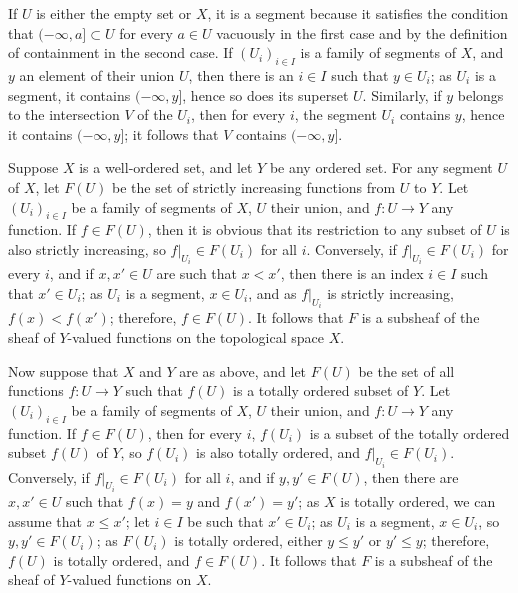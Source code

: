 \documentclass{article}
\begin{document}
\begin{solution}[\ref{exe:rpm18mof}]
  \label{sol:aeu4zzog}
  If \(U\) is either the empty set or \(X\), it is a segment because
  it satisfies the condition that \((-\infty, a] \subset U\) for every
  \(a \in U\) vacuously in the first case and by the definition of
  containment in the second case.  If \((U_i)_{i \in I}\) is a family
  of segments of \(X\), and \(y\) an element of their union \(U\),
  then there is an \(i \in I\) such that \(y \in U_i\); as \(U_i\) is
  a segment, it contains \((-\infty, y]\), hence so does its superset
  \(U\).  Similarly, if \(y\) belongs to the intersection \(V\) of the
  \(U_i\), then for every \(i\), the segment \(U_i\) contains \(y\),
  hence it contains \((-\infty, y]\); it follows that \(V\) contains
  \((-\infty, y]\).

  Suppose \(X\) is a well-ordered set, and let \(Y\) be any ordered
  set.  For any segment \(U\) of \(X\), let \(F(U)\) be the set of
  strictly increasing functions from \(U\) to \(Y\).  Let
  \((U_i)_{i \in I}\) be a family of segments of \(X\), \(U\) their
  union, and \(f : U \to Y\) any function.  If \(f \in F(U)\), then it
  is obvious that its restriction to any subset of \(U\) is also
  strictly increasing, so \(f \vert_{U_i} \in F(U_i)\) for all \(i\).
  Conversely, if \(f \vert_{U_i} \in F(U_i)\) for every \(i\), and if
  \(x, x' \in U\) are such that \(x < x'\), then there is an index
  \(i \in I\) such that \(x' \in U_i\); as \(U_i\) is a segment,
  \(x \in U_i\), and as \(f \vert_{U_i}\) is strictly increasing,
  \(f(x) < f(x')\); therefore, \(f \in F(U)\).  It follows that \(F\)
  is a subsheaf of the sheaf of \(Y\)-valued functions on the
  topological space \(X\).

  Now suppose that \(X\) and \(Y\) are as above, and let \(F(U)\) be
  the set of all functions \(f : U \to Y\) such that \(f(U)\) is a
  totally ordered subset of \(Y\).  Let \((U_i)_{i \in I}\) be a
  family of segments of \(X\), \(U\) their union, and \(f : U \to Y\)
  any function.  If \(f \in F(U)\), then for every \(i\), \(f(U_i)\)
  is a subset of the totally ordered subset \(f(U)\) of \(Y\), so
  \(f(U_i)\) is also totally ordered, and
  \(f \vert_{U_i} \in F(U_i)\).  Conversely, if
  \(f \vert_{U_i} \in F(U_i)\) for all \(i\), and if
  \(y, y' \in F(U)\), then there are \(x,x' \in U\) such that
  \(f(x) = y\) and \(f(x') = y'\); as \(X\) is totally ordered, we can
  assume that \(x \leq x'\); let \(i \in I\) be such that
  \(x' \in U_i\); as \(U_i\) is a segment, \(x \in U_i\), so
  \(y, y' \in F(U_i)\); as \(F(U_i)\) is totally ordered, either
  \(y \leq y'\) or \(y' \leq y\); therefore, \(f(U)\) is totally
  ordered, and \(f \in F(U)\).  It follows that \(F\) is a subsheaf of
  the sheaf of \(Y\)-valued functions on \(X\).
\end{solution}
\end{document}
